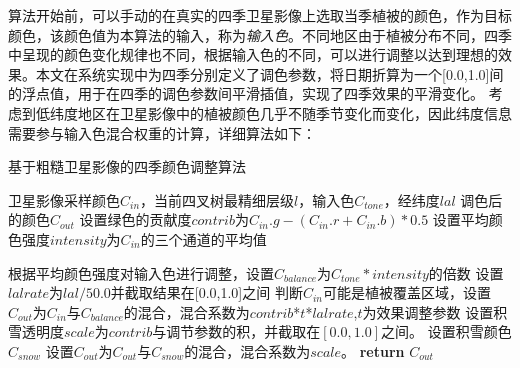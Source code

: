 算法开始前，可以手动的在真实的四季卫星影像上选取当季植被的颜色，作为目标颜色，该颜色值为本算法的输入，称为\textit{输入色}。不同地区由于植被分布不同，四季中呈现的颜色变化规律也不同，根据输入色的不同，可以进行调整以达到理想的效果。本文在系统实现中为四季分别定义了调色参数，将日期折算为一个[0.0,1.0]间的浮点值，用于在四季的调色参数间平滑插值，实现了四季效果的平滑变化。
考虑到低纬度地区在卫星影像中的植被颜色几乎不随季节变化而变化，因此纬度信息需要参与输入色混合权重的计算，详细算法如下：\par

\begin{algorithm}[H]
	\renewcommand{\algorithmicrequire}{\textbf{Input:}}
	\renewcommand{\algorithmicensure}{\textbf{Output:}}
	\caption{基于粗糙卫星影像的四季颜色调整算法}
	\label{alg:1}
	\begin{algorithmic}[1]
		\REQUIRE 卫星影像采样颜色$C_{in}$，当前四叉树最精细层级$l$，输入色$C_{tone}$，经纬度$lal$
		\newpage
		\ENSURE 调色后的颜色$C_{out}$
		\STATE 设置绿色的贡献度$contrib$为$C_{in}.g-(C_{in}.r+C_{in}.b)*0.5$
		\STATE 设置平均颜色强度$intensity$为$C_{in}$的三个通道的平均值
		
		\STATE 根据平均颜色强度对输入色进行调整，设置$C_{balance}$为$C_{tone}*intensity$的倍数
		\STATE 设置$lalrate$为$lal/50.0$并截取结果在[0.0,1.0]之间
	    \STATE 判断$C_{in}$可能是植被覆盖区域，设置$C_{out}$为$C_{in}$与$C_{balance}$的混合，混合系数为$contrib$*$t$*$lalrate$,$t$为效果调整参数
		\ENDIF
		\STATE 设置积雪透明度$scale$为$contrib$与调节参数的积，并截取在$[0.0,1.0]$之间。
		\STATE 设置积雪颜色$C_{snow}$
		\STATE 设置$C_{out}$为$C_{out}$与$C_{snow}$的混合，混合系数为$scale$。
		\ENDIF
		\STATE \textbf{return} $C_{out}$
	\end{algorithmic}
\end{algorithm}
\newpage

